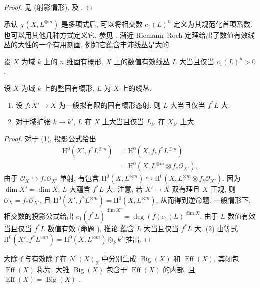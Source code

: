 \begin{proof}
见 \cite[推论 $1.4.41$]{Laz04a} (射影情形), \cite[定理 VI.$2.14$--$15$]{Kol96} 及 \cite[Tag 0BJ8]{SP}.
\end{proof}
承认 $\chi(X,L^{\otimes m})$ 是多项式后, 可以将相交数 $c_1(L)^n$ 定义为其规范化首项系数. 也可以用其他几种方式定义它, 参见 \cite[定理 VI.$2$]{Kol96}. 渐近 Riemann--Roch 定理给出了数值有效线丛的大性的一个有用刻画, 例如它蕴含丰沛线丛是大的.
\begin{corollary}[大性的刻画 II]\label{src:B.2.23}
设 $X$ 为域 $k$ 上的 $n$ 维固有概形. $X$ 上的数值有效线丛 $L$ 大当且仅当 $c_1(L)^n>0$.
\end{corollary}
\begin{proposition}[大性的性质]\label{src:B.2.24}
设 $X$ 为域 $k$ 上的整固有概形, $L$ 为 $X$ 上的线丛.
\begin{enumerate}[(1)]
\item 设 $f:X'\to X$ 为一般拟有限的固有概形态射. 则 $L$ 大当且仅当 $f^*L$ 大.
\item 对于域扩张 $k\to k'$, $L$ 在 $X$ 上大当且仅当 $L_{k'}$ 在 $X_{k'}$ 上大.
\end{enumerate}
\end{proposition}
\begin{proof}
对于 (1), 投影公式给出
\begin{align*}
\mathrm H^0(X',f^*L^{\otimes m})
&=\mathrm H^0(X,f_*f^*L^{\otimes m})\\
&=\mathrm H^0(X,L^{\otimes m}\otimes f_*\mathcal O_{X'}).
\end{align*}
由于 $\mathcal O_X\hookrightarrow f_*\mathcal O_{X'}$ 单射, 有包含 $\mathrm H^0(X,L^{\otimes m})\hookrightarrow\mathrm H^0(X,L^{\otimes m}\otimes f_*\mathcal O_{X'})$. 因为 $\dim X'=\dim X$, $L$ 大蕴含 $f^*L$ 大. 注意, 若 $X'\to X$ 双有理且 $X$ 正规, 则 $\mathcal O_X=f_*\mathcal O_{X'}$, 且 $\mathrm H^0(X',f^*L^{\otimes m})=\mathrm H^0(X,L^{\otimes m})$, 从而得到逆命题. 一般情形下, 相交数的投影公式给出 $c_1(f^*L)^{\dim X'}=\deg(f)c_1(L)^{\dim X}$. 由于 $L$ 数值有效当且仅当 $f^*L$ 数值有效 (命题 ), 推论  蕴含 $L$ 大当且仅当 $f^*L$ 大. (2) 由等式 $\mathrm H^0(X',f^*L^{\otimes m})=\mathrm H^0(X,L^{\otimes m})\otimes_k k'$ 推出.
\end{proof}
\begin{remark}[大锥与伪有效锥]\label{src:B.2.25}
大除子与有效除子在 $N^1(X)_{\mathbb R}$ 中分别生成 $\operatorname{Big}(X)$ 和 $\operatorname{Eff}(X)$, 其闭包 $\overline{\operatorname{Eff}}(X)$ 称为. 大锥 $\operatorname{Big}(X)$ 包含于 $\overline{\operatorname{Eff}}(X)$ 的内部, 且 $\overline{\operatorname{Eff}}(X)=\overline{\operatorname{Big}}(X)$ \cite[定理 $2.2.6$]{Laz04a}.
\end{remark}

